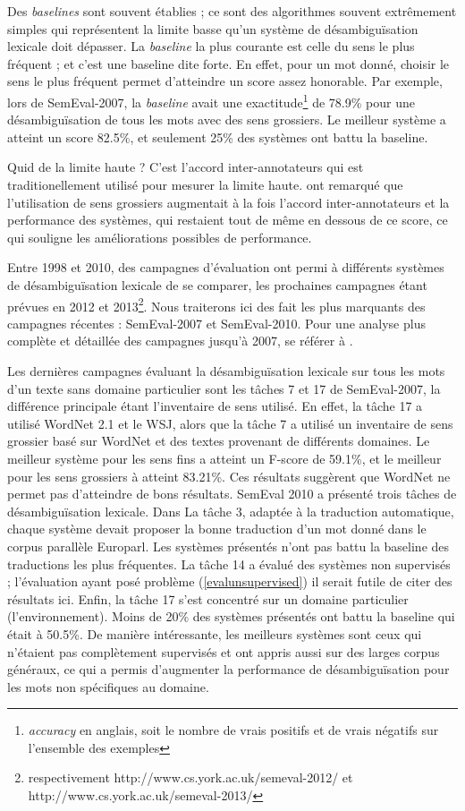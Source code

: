 Des \textit{baselines} sont souvent établies ; ce sont des algorithmes souvent
extrêmement simples qui représentent la limite basse qu'un système de
désambiguïsation lexicale doit dépasser. La \textit{baseline} la plus courante
est celle du sens le plus fréquent ; et c'est une baseline dite forte. En
effet, pour un mot donné, choisir le sens le plus fréquent permet d'atteindre
un score assez honorable. Par exemple, lors de SemEval-2007, la
\textit{baseline} avait une exactitude\footnote{\textit{accuracy} en anglais,
soit le nombre de vrais positifs et de vrais négatifs sur l'ensemble des
exemples} de 78.9\% pour une désambiguïsation de tous les mots avec des sens
grossiers. Le meilleur système a atteint un score 82.5\%, et seulement 25\% des
systèmes ont battu la baseline.

Quid de la limite haute ? C'est l'accord inter-annotateurs qui est
traditionellement utilisé pour mesurer la limite haute.
\cite{navigli2007semeval} ont remarqué que l'utilisation de sens grossiers
augmentait à la fois l'accord inter-annotateurs et la performance des systèmes,
qui restaient tout de même en dessous de ce score, ce qui souligne les
améliorations possibles de performance.

Entre 1998 et 2010, des campagnes d'évaluation ont permi à différents systèmes
de désambiguïsation lexicale de se comparer, les prochaines campagnes étant
prévues en 2012 et 2013\footnote{respectivement
http://www.cs.york.ac.uk/semeval-2012/ et
http://www.cs.york.ac.uk/semeval-2013/}. Nous traiterons ici des fait les plus
marquants des campagnes récentes : SemEval-2007 et SemEval-2010. Pour une
analyse plus complète et détaillée des campagnes jusqu'à 2007, se référer à
\cite{navigli2009word}.

Les dernières campagnes évaluant la désambiguïsation lexicale sur tous les mots
d'un texte sans domaine particulier sont les tâches 7 et 17 de SemEval-2007, la
différence principale étant l'inventaire de sens utilisé. En effet, la tâche 17
a utilisé WordNet 2.1 et le WSJ, alors que la tâche 7 a utilisé un inventaire
de sens grossier basé sur WordNet et des textes provenant de différents
domaines. Le meilleur système pour les sens fins a atteint un F-score de
59.1\%, et le meilleur pour les sens grossiers à atteint 83.21\%. Ces résultats
suggèrent que WordNet ne permet pas d'atteindre de bons résultats. SemEval 2010
a présenté trois tâches de désambiguïsation lexicale. Dans La tâche 3, adaptée
à la traduction automatique, chaque système devait proposer la bonne traduction
d'un mot donné dans le corpus parallèle Europarl. Les systèmes présentés n'ont
pas battu la baseline des traductions les plus fréquentes. La tâche 14 a évalué
des systèmes non supervisés ; l'évaluation ayant posé problème
(\ref{evalunsupervised}) il serait futile de citer des résultats ici. Enfin, la
tâche 17 s'est concentré sur un domaine particulier (l'environnement). Moins de
20\% des systèmes présentés ont battu la baseline qui était à 50.5\%. De
manière intéressante, les meilleurs systèmes sont ceux qui n'étaient pas
complètement supervisés et ont appris aussi sur des larges corpus généraux, ce
qui a permis d'augmenter la performance de désambiguïsation pour les mots non
spécifiques au domaine.

